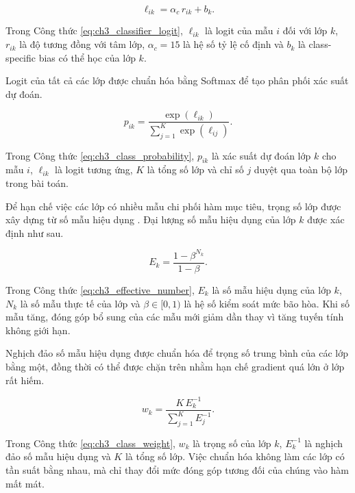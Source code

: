 \begin{equation}\ell_{ik}=\alpha_{c}\,r_{ik}+b_{k}.\label{eq:ch3_classifier_logit}\end{equation}

Trong Công thức \ref{eq:ch3_classifier_logit}, $\ell_{ik}$ là logit của mẫu $i$ đối với lớp $k$, $r_{ik}$ là độ tương đồng với tâm lớp, $\alpha_c=15$ là hệ số tỷ lệ cố định và $b_k$ là class-specific bias có thể học của lớp $k$.

Logit của tất cả các lớp được chuẩn hóa bằng Softmax để tạo phân phối xác suất dự đoán.

\begin{equation}p_{ik}=\frac{\exp\left(\ell_{ik}\right)}{\sum_{j=1}^{K}\exp\left(\ell_{ij}\right)}.\label{eq:ch3_class_probability}\end{equation}

Trong Công thức \ref{eq:ch3_class_probability}, $p_{ik}$ là xác suất dự đoán lớp $k$ cho mẫu $i$, $\ell_{ik}$ là logit tương ứng, $K$ là tổng số lớp và chỉ số $j$ duyệt qua toàn bộ lớp trong bài toán.

Để hạn chế việc các lớp có nhiều mẫu chi phối hàm mục tiêu, trọng số lớp được xây dựng từ số mẫu hiệu dụng \cite{Cui2019ClassBalanced}. Đại lượng số mẫu hiệu dụng của lớp $k$ được xác định như sau.

\begin{equation}E_{k}=\frac{1-\beta^{N_k}}{1-\beta}.\label{eq:ch3_effective_number}\end{equation}

Trong Công thức \ref{eq:ch3_effective_number}, $E_k$ là số mẫu hiệu dụng của lớp $k$, $N_k$ là số mẫu thực tế của lớp và $\beta\in[0,1)$ là hệ số kiểm soát mức bão hòa. Khi số mẫu tăng, đóng góp bổ sung của các mẫu mới giảm dần thay vì tăng tuyến tính không giới hạn.

Nghịch đảo số mẫu hiệu dụng được chuẩn hóa để trọng số trung bình của các lớp bằng một, đồng thời có thể được chặn trên nhằm hạn chế gradient quá lớn ở lớp rất hiếm.

\begin{equation}w_k=\frac{K\,E_k^{-1}}{\sum_{j=1}^{K}E_j^{-1}}.\label{eq:ch3_class_weight}\end{equation}

Trong Công thức \ref{eq:ch3_class_weight}, $w_k$ là trọng số của lớp $k$, $E_k^{-1}$ là nghịch đảo số mẫu hiệu dụng và $K$ là tổng số lớp. Việc chuẩn hóa không làm các lớp có tần suất bằng nhau, mà chỉ thay đổi mức đóng góp tương đối của chúng vào hàm mất mát.


